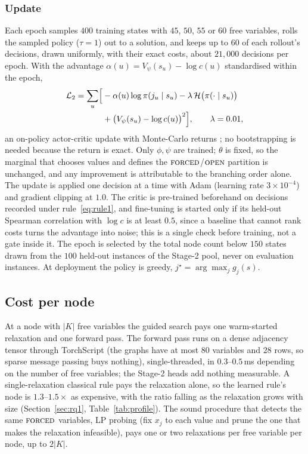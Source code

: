 \documentclass[final,5p,times,twocolumn,authoryear]{elsarticle}
\newcommand{\FORCED}{\textsc{forced}}
\newcommand{\FREE}{\textsc{open}}
\begin{document}
\subsubsection{Update}
Each epoch samples $400$ training states with $45$, $50$, $55$ or $60$ free variables, rolls the sampled policy ($\tau=1$) out to a solution, and keeps up to $60$ of each rollout's decisions, drawn uniformly, with their exact costs, about $21{,}000$ decisions per epoch. With the advantage $\alpha(u)=V_\psi(s_u)-\log c(u)$ standardised within the epoch,
\begin{equation}
\begin{split}
\mathcal{L}_2=\sum_u\Bigl[&-\alpha(u)\log\pi(j_u\mid s_u)-\lambda\,\mathcal{H}\bigl(\pi(\cdot\mid s_u)\bigr)\\
&+\bigl(V_\psi(s_u)-\log c(u)\bigr)^2\Bigr],\qquad\lambda=0.01,
\end{split}
\label{eq:loss2}
\end{equation}
an on-policy actor-critic update with Monte-Carlo returns \citep{williams1992simple}; no bootstrapping is needed because the return is exact. Only $\phi,\psi$ are trained; $\theta$ is fixed, so the marginal that chooses values and defines the $\FORCED$/$\FREE$ partition is unchanged, and any improvement is attributable to the branching order alone. The update is applied one decision at a time with Adam (learning rate $3\times10^{-4}$) and gradient clipping at $1.0$. The critic is pre-trained beforehand on decisions recorded under rule~\eqref{eq:rule1}, and fine-tuning is started only if its held-out Spearman correlation with $\log c$ is at least $0.5$, since a baseline that cannot rank costs turns the advantage into noise; this is a single check before training, not a gate inside it. The epoch is selected by the total node count below $150$ states drawn from the $100$ held-out instances of the Stage-2 pool, never on evaluation instances. At deployment the policy is greedy, $j^\star=\arg\max_j g_j(s)$.

\subsection{Cost per node}
\label{sec:method-cost}

At a node with $|K|$ free variables the guided search pays one warm-started relaxation and one forward pass. The forward pass runs on a dense adjacency tensor through TorchScript (the graphs have at most $80$ variables and $28$ rows, so sparse message passing buys nothing), single-threaded, in $0.3$--$0.5$\,ms depending on the number of free variables; the Stage-2 heads add nothing measurable. A single-relaxation classical rule pays the relaxation alone, so the learned rule's node is $1.3$--$1.5\times$ as expensive, with the ratio falling as the relaxation grows with size (Section~\ref{sec:rq1}, Table~\ref{tab:profile}). The sound procedure that detects the same $\FORCED$ variables, LP probing (fix $x_j$ to each value and prune the one that makes the relaxation infeasible), pays one or two relaxations per free variable per node, up to $2|K|$.
\end{document}
